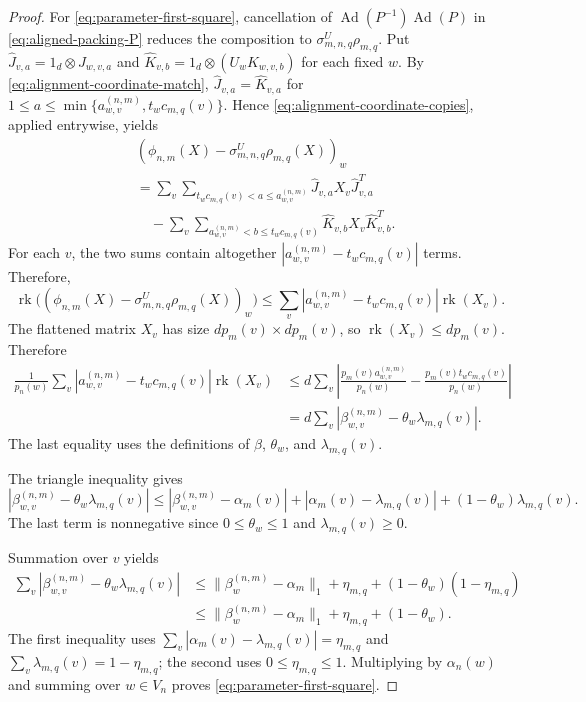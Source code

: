 \documentclass[10pt,a4paper]{amsart}
\DeclareMathOperator{\Ad}{Ad}
\DeclareMathOperator{\rk}{rk}
\begin{document}
\begin{proof}
For \eqref{eq:parameter-first-square}, cancellation of
$\Ad(P^{-1})\Ad(P)$ in \eqref{eq:aligned-packing-P} reduces the composition to
$\sigma_{m,n,q}^{U}\rho_{m,q}$.
Put $\widehat J_{v,a}=1_d\otimes J_{w,v,a}$ and
$\widehat K_{v,b}=1_d\otimes(U_wK_{w,v,b})$ for each fixed $w$.
By \eqref{eq:alignment-coordinate-match},
$\widehat J_{v,a}=\widehat K_{v,a}$ for
$1\leq a\leq\min\{a_{w,v}^{(n,m)},t_wc_{m,q}(v)\}$.
Hence \eqref{eq:alignment-coordinate-copies}, applied entrywise, yields
\[
 \begin{aligned}
 &(\phi_{n,m}(X)-\sigma_{m,n,q}^{U}\rho_{m,q}(X))_w\\
 &=\sum_v\sum_{t_wc_{m,q}(v)<a\leq a_{w,v}^{(n,m)}}
       \widehat J_{v,a}X_v\widehat J_{v,a}^{T}\\
 &\quad-\sum_v\sum_{a_{w,v}^{(n,m)}<b\leq t_wc_{m,q}(v)}
       \widehat K_{v,b}X_v\widehat K_{v,b}^{T}.
 \end{aligned}
\]
For each $v$, the two sums contain altogether
$|a_{w,v}^{(n,m)}-t_wc_{m,q}(v)|$ terms.
Therefore,
\[
  \rk\bigl((\phi_{n,m}(X)-\sigma_{m,n,q}^{U}\rho_{m,q}(X))_w\bigr)\leq\sum_v|a_{w,v}^{(n,m)}-t_wc_{m,q}(v)|\rk(X_v).
\]
The flattened matrix $X_v$ has size $dp_m(v)\times dp_m(v)$, so
$\rk(X_v)\leq dp_m(v)$.  Therefore
\[
 \begin{aligned}
 \frac1{p_n(w)}\sum_v
 |a_{w,v}^{(n,m)}-t_wc_{m,q}(v)|\rk(X_v)
 &\leq d\sum_v
 \left|\frac{p_m(v)a_{w,v}^{(n,m)}}{p_n(w)}
       -\frac{p_m(v)t_wc_{m,q}(v)}{p_n(w)}\right|\\
 &=d\sum_v
       |\beta_{w,v}^{(n,m)}-\theta_w\lambda_{m,q}(v)|.
 \end{aligned}
\]
The last equality uses the definitions of $\beta$, $\theta_w$, and
$\lambda_{m,q}(v)$.

The triangle inequality gives
\[
 |\beta_{w,v}^{(n,m)}-\theta_w\lambda_{m,q}(v)|
 \leq|\beta_{w,v}^{(n,m)}-\alpha_m(v)|
       +|\alpha_m(v)-\lambda_{m,q}(v)|+(1-\theta_w)\lambda_{m,q}(v).
\]
The last term is nonnegative since $0\leq\theta_w\leq1$ and
$\lambda_{m,q}(v)\geq0$.

Summation over $v$ yields
\[
 \begin{aligned}
 \sum_v|\beta_{w,v}^{(n,m)}-\theta_w\lambda_{m,q}(v)|
 &\leq\|\beta_w^{(n,m)}-\alpha_m\|_1
       +\eta_{m,q}+(1-\theta_w)(1-\eta_{m,q})\\
 &\leq\|\beta_w^{(n,m)}-\alpha_m\|_1
       +\eta_{m,q}+(1-\theta_w).
 \end{aligned}
\]
The first inequality uses
$\sum_v|\alpha_m(v)-\lambda_{m,q}(v)|=\eta_{m,q}$ and
$\sum_v\lambda_{m,q}(v)=1-\eta_{m,q}$; the second uses
$0\leq\eta_{m,q}\leq1$.
Multiplying by $\alpha_n(w)$ and summing over $w\in V_n$ proves
\eqref{eq:parameter-first-square}.


\end{proof}
\end{document}
